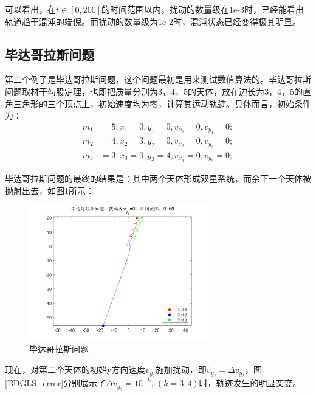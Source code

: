\documentclass{article}
\begin{document}
可以看出，在$t\in[0,200]$的时间范围以内，扰动的数量级在1e-3时，已经能看出轨道趋于混沌的端倪。而扰动的数量级为1e-2时，混沌状态已经变得极其明显。
\subsection{毕达哥拉斯问题}
\par 第二个例子是毕达哥拉斯问题，这个问题最初是用来测试数值算法的。毕达哥拉斯问题取材于勾股定理，也即把质量分别为3，4，5的天体，放在边长为3，4，5的直角三角形的三个顶点上，初始速度均为零，计算其运动轨迹。具体而言，初始条件为：
\begin{align*}
	m_1&=5,x_1= 0 ,y_1= 0,v_{x_1}= 0, v_{y_1}= 0;\\
	m_2&=4,x_2= 3 ,y_2= 0,	v_{x_2}= 0 ,v_{y_2}= 0;\\
	m_3&=3,x_3= 0 ,y_3=4,v_{x_3}= 0, v_{y_3}=0;
\end{align*}
\par 毕达哥拉斯问题的最终的结果是：其中两个天体形成双星系统，而余下一个天体被抛射出去，如图\ref{BDGLS}所示：
\begin{figure}[H]
	\centering  %
	\includegraphics[width=0.7\textwidth]{毕达哥拉斯问题-初值敏感2//扰动0}
	\caption{毕达哥拉斯问题}
	\label{BDGLS}
\end{figure}
\par 现在，对第二个天体的初始y方向速度$v_{y_2}$施加扰动，即$\tilde{v_{y_2}}=\Delta v_{y_2}$，图\ref{BDGLS_error}分别展示了$\Delta v_{y_2} = 10^{-k},\, (k=3,4)$时，轨迹发生的明显突变。
\end{document}
